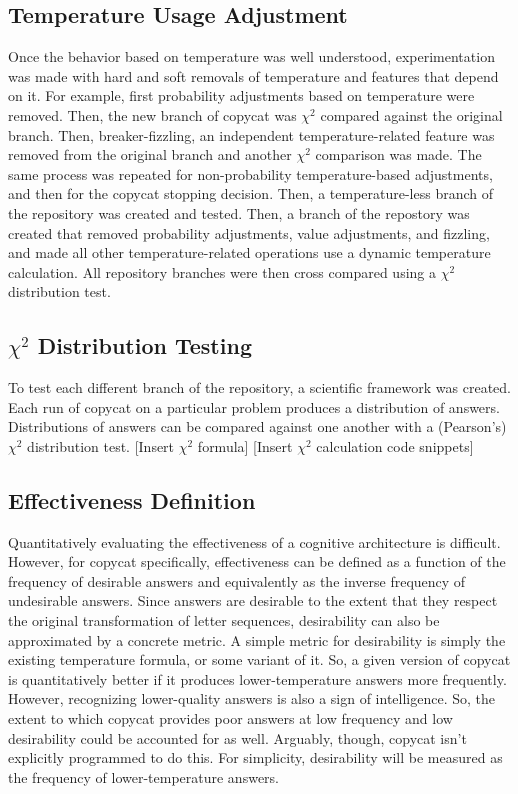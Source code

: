 \documentclass[a4paper]{article}
\begin{document}
    \subsection{Temperature Usage Adjustment}
        Once the behavior based on temperature was well understood, experimentation was made with hard and soft removals of temperature and features that depend on it.
        For example, first probability adjustments based on temperature were removed.
        Then, the new branch of copycat was $\chi^2$ compared against the original branch.
        Then, breaker-fizzling, an independent temperature-related feature was removed from the original branch and another $\chi^2$ comparison was made.
        The same process was repeated for non-probability temperature-based adjustments, and then for the copycat stopping decision.
        Then, a temperature-less branch of the repository was created and tested.
        Then, a branch of the repostory was created that removed probability adjustments, value adjustments, and fizzling, and made all other temperature-related operations use a dynamic temperature calculation.
        All repository branches were then cross compared using a $\chi^2$ distribution test.
    \subsection{$\chi^2$ Distribution Testing}
        To test each different branch of the repository, a scientific framework was created.
        Each run of copycat on a particular problem produces a distribution of answers.
        Distributions of answers can be compared against one another with a (Pearson's) $\chi^2$ distribution test.
        [Insert $\chi^2$ formula]
        [Insert $\chi^2$ calculation code snippets]
    \subsection{Effectiveness Definition}
        Quantitatively evaluating the effectiveness of a cognitive architecture is difficult.
        However, for copycat specifically, effectiveness can be defined as a function of the frequency of desirable answers and equivalently as the inverse frequency of undesirable answers.
        Since answers are desirable to the extent that they respect the original transformation of letter sequences, desirability can also be approximated by a concrete metric.
        A simple metric for desirability is simply the existing temperature formula, or some variant of it.
        So, a given version of copycat is quantitatively better if it produces lower-temperature answers more frequently.
        However, recognizing lower-quality answers is also a sign of intelligence.
        So, the extent to which copycat provides poor answers at low frequency and low desirability could be accounted for as well.
        Arguably, though, copycat isn't explicitly programmed to do this.
        For simplicity, desirability will be measured as the frequency of lower-temperature answers.
\end{document}
